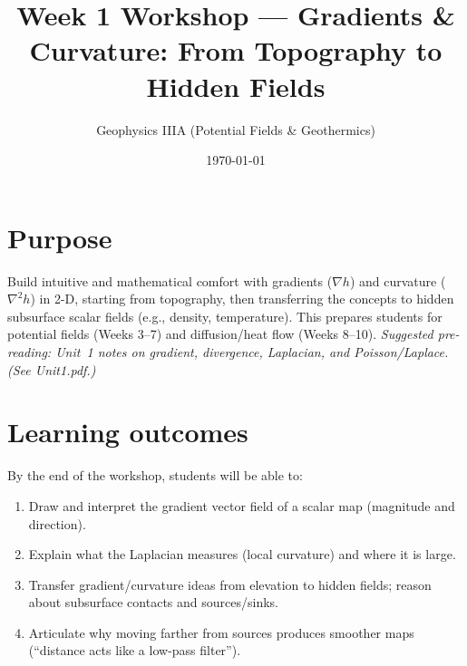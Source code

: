 \documentclass[11pt,a4paper]{article}
\title{Week 1 Workshop — Gradients \& Curvature: From Topography to Hidden Fields}
\author{Geophysics IIIA (Potential Fields \& Geothermics)}
\date{\today}
\begin{document}
\maketitle

\section*{Purpose}
Build intuitive and mathematical comfort with gradients ($\nabla h$) and curvature ($\nabla^2 h$) in 2-D, starting from topography, then transferring the concepts to hidden subsurface scalar fields (e.g., density, temperature). This prepares students for potential fields (Weeks 3--7) and diffusion/heat flow (Weeks 8--10). \textit{Suggested pre-reading: Unit~1 notes on gradient, divergence, Laplacian, and Poisson/Laplace.} \emph{(See Unit1.pdf.)} \cite{unit1}


\section*{Learning outcomes}
By the end of the workshop, students will be able to:
\begin{enumerate}
  \item Draw and interpret the gradient vector field of a scalar map (magnitude and direction).
  \item Explain what the Laplacian measures (local curvature) and where it is large.
  \item Transfer gradient/curvature ideas from elevation to hidden fields; reason about subsurface contacts and sources/sinks.
  \item Articulate why moving farther from sources produces smoother maps (``distance acts like a low-pass filter'').
\end{enumerate}
\end{document}

